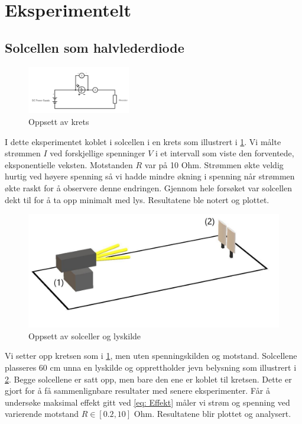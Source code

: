 \documentclass[reprint,norsk,notitlepage]{revtex4-2}
\begin{document}
\section{Eksperimentelt} \label{sec: method}
\subsection{Solcellen som halvlederdiode}
\begin{figure}[h!]
    \centering
    \includegraphics[width = 0.4\textwidth]{Oppsett_1.png}
    \caption{Oppsett av krets}
    \label{fig: Oppgave 1}
\end{figure}
I dette eksperimentet koblet i solcellen i en krets som illustrert i \cref{fig: Oppgave 1}. Vi målte strømmen $I$ ved forskjellige spenninger $V$ i et intervall som viste den forventede, eksponentielle veksten. Motstanden $R$ var på 10 Ohm. Strømmen økte veldig hurtig ved høyere spenning så vi hadde mindre økning i spenning når strømmen økte raskt for å observere denne endringen. Gjennom hele forsøket var solcellen dekt til for å ta opp minimalt med lys. Resultatene ble notert og plottet. 
\newpage

\begin{figure}[h!]
  \centering
  \includegraphics[width = .4\textwidth]{Opsett.jpg}
  \caption{Oppsett av solceller og lyskilde}
  \label{fig: Opsett}
\end{figure}


Vi setter opp kretsen som i \cref{fig: Oppgave 1}, men uten spenningskilden og motstand. Solcellene plasseres 60 cm unna en lyskilde og opprettholder jevn belysning som illustrert i \cref{fig: Opsett}. Begge solcellene er satt opp, men bare den ene er koblet til kretsen. Dette er gjort for å få sammenlignbare resultater med senere eksperimenter. Får å undersøke maksimal effekt gitt ved \cref{eq: Effekt} måler vi strøm og spenning ved varierende motstand $R ∈ [0.2, 10]$ Ohm. Resultatene blir plottet og analysert.
\end{document}

